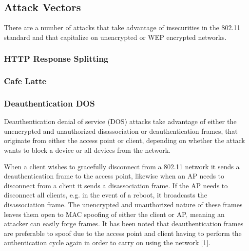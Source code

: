 \subsection{Attack Vectors}
There are a number of attacks that take advantage of insecurities in the 802.11 standard and that capitalize on unencrypted or WEP encrypted networks. 



\subsubsection{HTTP Response Splitting}
\subsubsection{Cafe Latte}
\subsubsection{Deauthentication DOS}
Deauthentication denial of service (DOS) attacks take advantage of either the unencrypted and unauthorized disassociation or deauthentication frames, that originate from either the access point or client, depending on whether the attack wants to block a device or all devices from the network.

When a client wishes to gracefully disconnect from a 802.11 network it sends a deauthentication frame to the access point, likewise when an AP needs to disconnect from a client it sends a disassociation frame. If the AP needs to disconnect all clients, e.g. in the event of a reboot, it broadcasts the disassociation frame. The unencrypted and unauthorized nature of these frames leaves them open to MAC spoofing of either the client or AP, meaning an attacker can easily forge frames. It has been noted that deauthentication frames are preferable to spoof due to the access point and client having to perform the authentication cycle again in order to carry on using the network [1].

